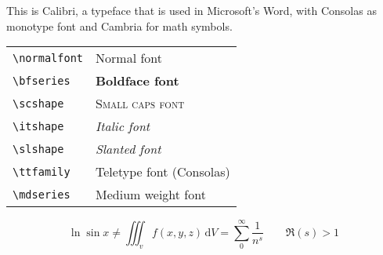 \documentclass[a4paper,12pt]{article}
\begin{document}
This is Calibri, a typeface that is used in Microsoft's Word, with Consolas as monotype font and Cambria for math symbols.

\vspace*{.5cm}
\begin{tabular}{l|l}
\verb|\normalfont| & Normal font \\
\verb|\bfseries| & \textbf{Boldface font} \\
\verb|\scshape| & {\scshape Small caps font} \\
\verb|\itshape| & {\itshape Italic font} \\
\verb|\slshape| & {\slshape Slanted font} \\
\verb|\ttfamily| & {\ttfamily Teletype font (Consolas)} \\
\verb|\mdseries| & {\mdseries Medium weight font}
\end{tabular}

\vspace*{.5cm}

\kant[1-2]

\begin{equation}
\ln \sin x \neq \iiint_v f(x,y,z)\, \mathrm{d} V = \sum_{0}^{\infty} \frac{1}{n^s} \qquad \Re(s) > 1
\end{equation}
\end{document}

